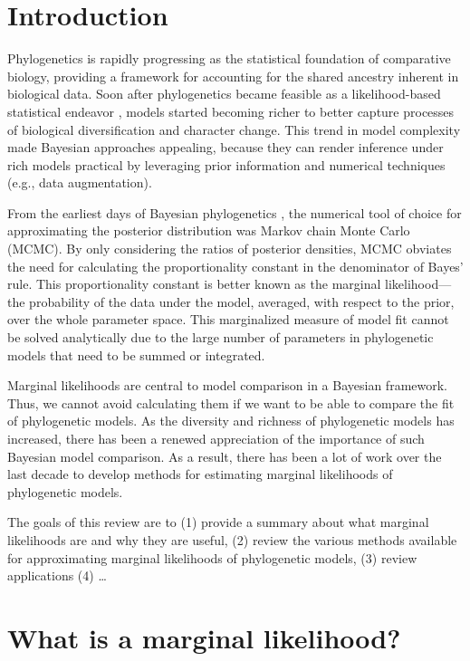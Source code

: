 \section{Introduction}

Phylogenetics is rapidly progressing as the statistical foundation of
comparative biology, providing a framework for accounting for the shared
ancestry inherent in biological data.
Soon after phylogenetics became feasible as a likelihood-based statistical
endeavor \citep{Felsenstein1981}, models started becoming richer to better
capture processes of biological diversification and character change.
This trend in model complexity made Bayesian approaches appealing, because they
can render inference under rich models practical by leveraging prior
information and numerical techniques (e.g., data augmentation).

From the earliest days of Bayesian phylogenetics \citep{Rannala1996,Mau1997},
the numerical tool of choice for approximating the posterior distribution was
Markov chain Monte Carlo (MCMC).
By only considering the ratios of posterior densities, MCMC obviates the need
for calculating the proportionality constant in the denominator of Bayes' rule.
This proportionality constant is better known as the marginal likelihood---the
probability of the data under the model, averaged, with respect to the prior,
over the whole parameter space.
This marginalized measure of model fit cannot be solved analytically due to
the large number of parameters in phylogenetic models that need to be summed or
integrated.

Marginal likelihoods are central to model comparison in a Bayesian framework.
Thus, we cannot avoid calculating them if we want to be able to compare the fit
of phylogenetic models.
As the diversity and richness of phylogenetic models has increased, there has
been a renewed appreciation of the importance of such Bayesian model
comparison.
As a result, there has been a lot of work over the last decade to develop
methods for estimating marginal likelihoods of phylogenetic models.

The goals of this review are to
(1) provide a summary about what marginal likelihoods are and why they are
useful,
(2) review the various methods available for approximating marginal likelihoods
of phylogenetic models,
(3) review applications
(4) \ldots

\section{What is a marginal likelihood?}

